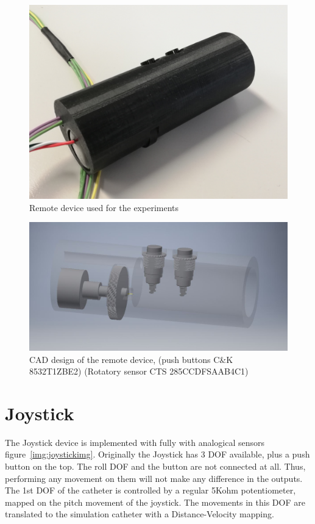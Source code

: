 \begin{figure}[ht]
   \centering
   \includegraphics[width=0.7\linewidth]{img/remote.jpg}
   \caption{Remote device used for the experiments}
   \label{img:remotenorm}
\end{figure}

\begin{figure}[ht]
   \centering
   \includegraphics[width=0.7\linewidth]{img/remotecad.jpg}
   \caption{CAD design of the remote device, (push buttons C\&K 8532T1ZBE2) (Rotatory sensor CTS 285CCDFSAAB4C1)}
   \label{img:remotecad}
\end{figure}

\section{Joystick}\label{sec:joystick}

The Joystick device is implemented with fully with analogical sensors figure~\ref{img:joystickimg}. Originally the Joystick has 3 DOF available, plus a push button on the top. The roll DOF and the button are not connected at all. Thus, performing any movement on them will not make any difference in the outputs.\\

The 1st DOF of the catheter is controlled by a regular 5Kohm potentiometer, mapped on the pitch movement of the joystick. The movements in this DOF are translated to the simulation catheter with a Distance-Velocity mapping.\\

